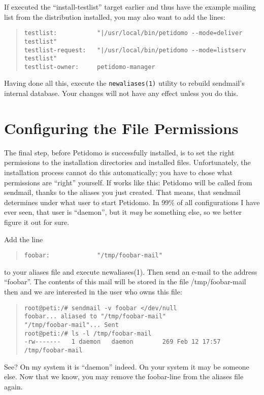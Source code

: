 \documentclass[a4paper,11pt]{scrreprt}
\newcommand{\file}[1]{{\textsf{#1}}}
\begin{document}
If executed the ``install-testlist'' target earlier and thus have the
example mailing list from the distribution installed, you may also
want to add the lines:
\begin{quote}
\begin{verbatim}
testlist:           "|/usr/local/bin/petidomo --mode=deliver testlist"
testlist-request:   "|/usr/local/bin/petidomo --mode=listserv testlist"
testlist-owner:     petidomo-manager
\end{verbatim}
\end{quote}
Having done all this, execute the \texttt{newaliases(1)} utility to rebuild
sendmail's internal database. Your changes will not have any effect unless you
do this.

\section{Configuring the File Permissions}

The final step, before Petidomo is successfully installed, is to set
the right permissions to the installation directories and installed
files. Unfortunately, the installation process cannot do this
automatically; you have to chose what permissions are ``right''
yourself. If works like this: Petidomo will be called from sendmail,
thanks to the aliases you just created. That means, that sendmail
determines under what user to start Petidomo. In 99\% of all
configurations I have ever seen, that user is ``daemon'', but it
\emph{may} be something else, so we better figure it out for sure.

Add the line
\begin{quote}
\begin{verbatim}
foobar:             "/tmp/foobar-mail"
\end{verbatim}
\end{quote}
to your aliases file and execute newaliases(1). Then send an e-mail to
the address ``foobar''. The contents of this mail will be stored in
the file \file{/tmp/foobar-mail} then and we are interested in the user
who owns this file:
\begin{quote}
\begin{verbatim}
root@peti:/# sendmail -v foobar </dev/null
foobar... aliased to "/tmp/foobar-mail"
"/tmp/foobar-mail"... Sent
root@peti:/# ls -l /tmp/foobar-mail
-rw-------   1 daemon   daemon        269 Feb 12 17:57 /tmp/foobar-mail
\end{verbatim}
\end{quote}
See? On my system it is ``daemon'' indeed. On your system it may be
someone else. Now that we know, you may remove the foobar-line from
the aliases file again.
\end{document}
